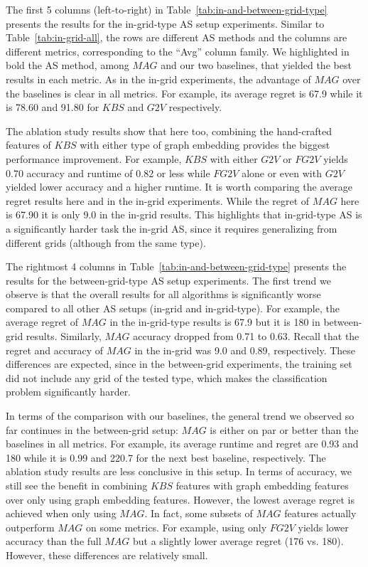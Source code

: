\documentclass{ecai}
\newcommand{\gtv}[1]{\ensuremath{\textit{G2V}}\xspace}
\newcommand{\fgtv}[1]{\ensuremath{\textit{FG2V}}\xspace}
\newcommand{\kaduri}[1]{\ensuremath{\textit{KBS}}\xspace}
\newcommand{\mapfgas}[1]{\ensuremath{\textit{MAG}}\xspace}
\begin{document}
The first 5 columns (left-to-right) in Table~\ref{tab:in-and-between-grid-type} presents the results for the in-grid-type AS setup experiments. 
Similar to Table~\ref{tab:in-grid-all}, the rows are different AS methods and the columns are different metrics, corresponding to the ``Avg'' column family. 
We highlighted in bold the AS method, among \mapfgas\ and our two baselines,  that yielded the best results in each metric. 
As in the in-grid experiments, the advantage of \mapfgas\ over the baselines is clear in all metrics. For example, its average regret is 67.9 while it is 78.60 and 91.80 for \kaduri\ and \gtv, respectively. 


The ablation study results show that here too, combining the hand-crafted features of \kaduri\ with either type of graph embedding provides the biggest performance improvement. For example, \kaduri\ with either \gtv\ or \fgtv\ yields 0.70 accuracy and runtime of 0.82 or less while \fgtv\ alone or even with \gtv\ yielded lower accuracy and a higher runtime. It is worth comparing the average regret results here and in the in-grid experiments. While the regret of \mapfgas\ here is 67.90 it is only 9.0 in the in-grid results. This highlights that in-grid-type AS is a significantly harder task the in-grid AS, since it requires generalizing from different grids (although from the same type). 


The rightmost 4 columns in Table~\ref{tab:in-and-between-grid-type} presents the results for the between-grid-type AS setup experiments. 
The first trend we observe is that the overall results for all algorithms is significantly worse compared to all other AS setups (in-grid and in-grid-type). 
For example, the average regret of \mapfgas\ in the in-grid-type results is 67.9 but it is 180 in between-grid results. Similarly, \mapfgas\ accuracy dropped from 0.71 to 0.63. Recall that the regret and accuracy of \mapfgas\ in the in-grid
was 9.0 and 0.89, respectively. These differences are expected, since in the between-grid experiments, the training set did not include any grid of the tested type, which makes the classification problem significantly harder. 


In terms of the comparison with our baselines, the general trend we observed so far continues in the between-grid setup: \mapfgas\ is either on par or better than the baselines in all metrics. 
For example, its average runtime and regret are 0.93 and 180 while it is 0.99 and 220.7 for the next best baseline, respectively. 
The ablation study results are less conclusive in this setup. 
In terms of accuracy, we still see the benefit in combining \kaduri\ features with graph embedding features over only using graph embedding features. However, the lowest average regret is achieved when only using \mapfgas\ . In fact, some subsets of \mapfgas\ features actually outperform \mapfgas\ on some metrics. For example, using only \fgtv\ yields lower accuracy than the full \mapfgas\ but a slightly lower average regret (176 vs. 180). However, these differences are relatively small. 
\end{document}
